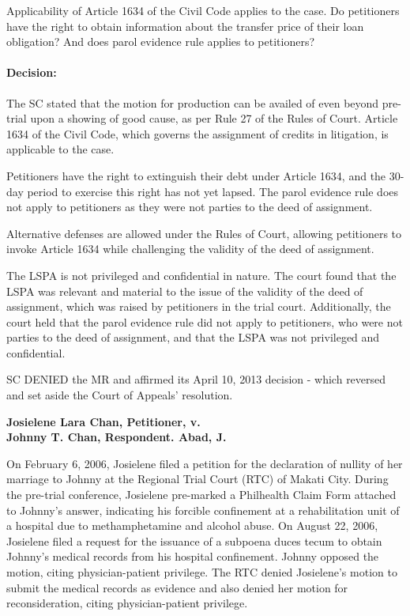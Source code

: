 \documentclass[
12pt,
oneside,
onehalfspacing,
headsepline
]{DigestCollection}
\begin{document}
Applicability of Article 1634 of the Civil Code applies to the case. Do petitioners have the right to obtain information about the transfer price of their loan obligation? And does parol evidence rule applies to petitioners?

\paragraph{Decision:}
\label{18c93f40-09fe-11ef-932c-63c852f65e48}


The SC stated that the motion for production can be availed of even beyond pre-trial upon a showing of good cause, as per Rule 27 of the Rules of Court. Article 1634 of the Civil Code, which governs the assignment of credits in litigation, is applicable to the case.

Petitioners have the right to extinguish their debt under Article 1634, and the 30-day period to exercise this right has not yet lapsed. The parol evidence rule does not apply to petitioners as they were not parties to the deed of assignment.

Alternative defenses are allowed under the Rules of Court, allowing petitioners to invoke Article 1634 while challenging the validity of the deed of assignment. 

The LSPA is not privileged and confidential in nature. The court found that the LSPA was relevant and material to the issue of the validity of the deed of assignment, which was raised by petitioners in the trial court. Additionally, the court held that the parol evidence rule did not apply to petitioners, who were not parties to the deed of assignment, and that the LSPA was not privileged and confidential.

SC DENIED the MR and affirmed its April 10, 2013 decision - which reversed and set aside the Court of Appeals' resolution.

\label{39ec80d0-0a10-11ef-932c-63c852f65e48}


\noindent\textbf{Josielene Lara Chan, Petitioner, v. \\Johnny T. Chan, Respondent. Abad, J.}\vspace{0.4cm}

On February 6, 2006, Josielene filed a petition for the declaration of nullity of her marriage to Johnny at the Regional Trial Court (RTC) of Makati City. During the pre-trial conference, Josielene pre-marked a Philhealth Claim Form attached to Johnny's answer, indicating his forcible confinement at a rehabilitation unit of a hospital due to methamphetamine and alcohol abuse. On August 22, 2006, Josielene filed a request for the issuance of a subpoena duces tecum to obtain Johnny's medical records from his hospital confinement. Johnny opposed the motion, citing physician-patient privilege. The RTC denied Josielene's motion to submit the medical records as evidence and also denied her motion for reconsideration, citing physician-patient privilege.
\end{document}
